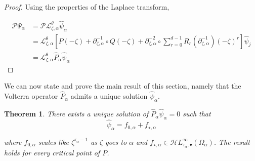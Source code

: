 \documentclass{article}
\theoremstyle{plain}
\newtheorem{thm}{Theorem}
\newcommand{\laplace}{\mathcal{L}}
\newcommand{\fracderiv}[3]{\partial^{#1}_{#2, #3}}
\newcommand{\singexp}[2]{\mathcal{H}L^\infty_{#1, #2}}
\newcommand{\singexpalg}[1]{\singexp{#1}{\bullet}}
\begin{document}
\begin{proof}
Using the properties of the Laplace transform, 

    \begin{align*}
        \mathcal{P}\Psi_\alpha&=\mathcal{P}\laplace_{\zeta,\alpha}^{\theta}\hat{\psi}_\alpha\\
        &=\laplace_{\zeta,\alpha}^{\theta}\left[P(-\zeta)+\fracderiv{-1}{\zeta}{\alpha}\circ Q(-\zeta)+\fracderiv{-2}{\zeta}{\alpha}\circ\sum_{r=0}^{d-1}R_r(\fracderiv{-1}{\zeta}{\alpha})(-\zeta)^r\right]\hat{\psi}_j\\
        &=\laplace_{\zeta,\alpha}^{\theta}\hat{P}_\alpha\hat{\psi}_\alpha
    \end{align*}
\end{proof}

We can now state and prove the main result of this section, namely that the Volterra operator $\hat{P}_\alpha$ admits a unique solution $\hat{\psi}_\alpha$. %

\begin{thm}\label{thm:example}
    There exists a unique solution of $\hat{P}_\alpha\hat{\psi}_\alpha=0$ such that 
    \[\hat{\psi}_\alpha = f_{0,\alpha}+ f_{\star,\alpha}\]

    where $f_{0,\alpha}$ scales like $\zeta^{\tau_\alpha-1}$ as $\zeta$ goes to $\alpha$ and $f_{\star,\alpha}\in\singexpalg{\tau_\alpha}(\Omega_\alpha)$. The result holds for every critical point of $P$. 
\end{thm}
\end{document}
